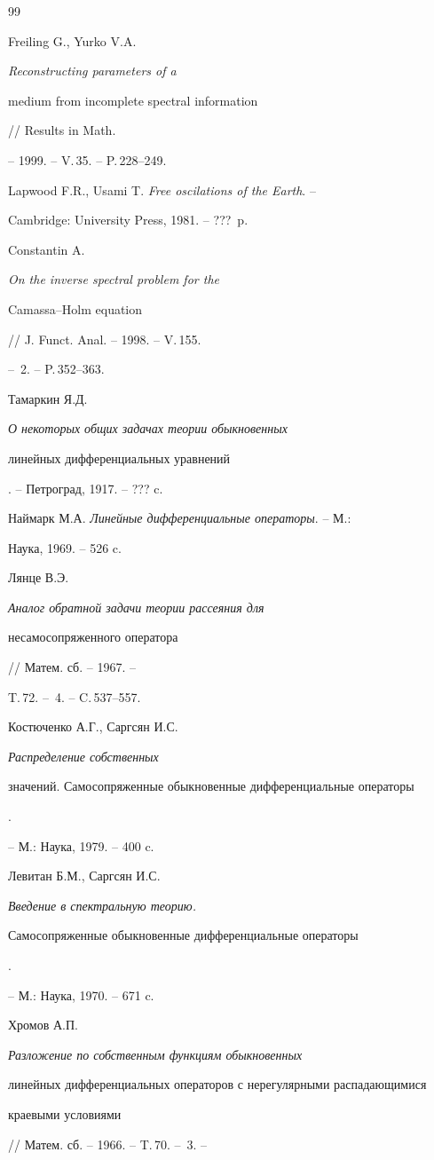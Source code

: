 \begin{thebibliography}{99}





 Freiling G., Yurko V.A. {\em Reconstructing parameters of a


medium from incomplete spectral information} // Results in Math.


-- 1999. -- V.\,35. -- P.\,228--249.


 Lapwood F.R., Usami T. {\em Free oscilations of the Earth}. --


Cambridge: University Press, 1981. -- ???~p.


 Constantin A. {\em On the inverse spectral problem for the


Camassa--Holm equation} // J. Funct. Anal. -- 1998. -- V.\,155.


-- \No\,2. -- P.\,352--363.


 Тамаркин Я.Д. {\em О некоторых общих задачах теории обыкновенных


линейных дифференциальных уравнений}. -- Петроград, 1917. -- ??? c.


 Наймарк М.А. {\em Линейные дифференциальные операторы}. -- М.:


Наука, 1969. -- 526 c.


 Лянце В.Э. {\em Аналог обратной задачи теории рассеяния для


несамосопряженного оператора} // Матем. сб. -- 1967. --


T.\,72. -- \No\,4. -- C.\,537--557.


 Костюченко А.Г., Саргсян И.С. {\em Распределение собственных


значений. Самосопряженные обыкновенные дифференциальные операторы}.


-- М.: Наука, 1979. -- 400 c.


 Левитан Б.М., Саргсян И.С. {\em Введение в спектральную теорию.


Самосопряженные обыкновенные дифференциальные операторы}.


-- М.: Наука, 1970. -- 671 c.


 Хромов А.П. {\em Разложение по собственным функциям обыкновенных


линейных дифференциальных операторов с нерегулярными распадающимися


краевыми условиями} // Матем. сб. -- 1966. -- T.\,70. -- \No\,3. --



\end{thebibliography}
